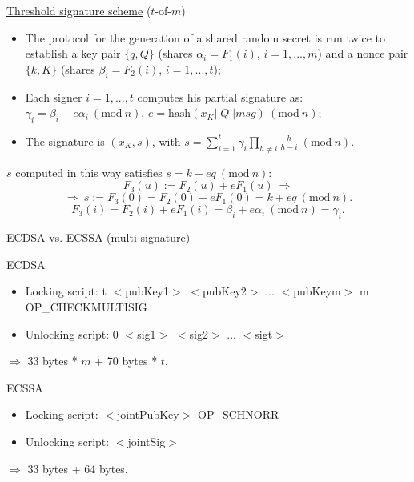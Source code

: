 \documentclass[slidescentered]{beamer}
\begin{document}
	\begin{frame}{\hyperlink{threshold}{Threshold signature scheme} ($t$-of-$m$)}
		\begin{itemize}
			\item The protocol for the generation of a shared random secret is run twice to establish a key pair $\{q, Q\}$ (shares $\alpha_i = F_1(i)$, $i = 1, ..., m$) and a nonce pair $\{k, K\}$ (shares $\beta_i = F_2(i)$, $i = 1, ..., t$);
			\item Each signer $i = 1, ..., t$ computes his partial signature as: $\gamma_i = \beta_i + e\alpha_i \ (\text{mod} \ n)$, $e = \text{hash}(x_K || Q || msg) \ (\text{mod} \ n)$;
			\item The signature is $(x_K, s)$, with $s = \sum_{i = 1}^{t}\gamma_i\prod_{h \neq i}\frac{h}{h - i} \ (\text{mod} \ n)$.
		\end{itemize}
		
		$s$ computed in this way satisfies $s = k + eq \ (\text{mod} \ n)$: 
		$$F_3(u) := F_2(u) + eF_1(u) \ \Longrightarrow$$ 
		$$\Longrightarrow \ s := F_3(0) = F_2(0) + eF_1(0) = k + eq \ (\text{mod} \ n).$$
		$$F_3(i) = F_2(i) + eF_1(i) = \beta_i + e\alpha_i \ (\text{mod} \ n) = \gamma_i.$$
	\end{frame}

	\begin{frame}{ECDSA vs. ECSSA (multi-signature)}
		\begin{block}{ECDSA}
			\begin{itemize}
				\item Locking script: t $<$pubKey1$>$ $<$pubKey2$>$ ... $<$pubKeym$>$ \hphantom{em} \hphantom{em} \hphantom{em} \hphantom{ipsem}m
				OP\_CHECKMULTISIG
				\item Unlocking script: 0 $<$sig1$>$ $<$sig2$>$ ... $<$sigt$>$
			\end{itemize}
		\end{block}
	
		$\Longrightarrow$ 33 bytes * $m$ + 70 bytes * $t$. 
		
		\bigskip
		\noindent
		\begin{block}{ECSSA}
			\begin{itemize}
				\item Locking script: $<$jointPubKey$>$ OP\_SCHNORR
				\item Unlocking script: $<$jointSig$>$
			\end{itemize}
		\end{block}
	
	 $\Longrightarrow$ 33 bytes + 64 bytes.
	\end{frame}
\end{document}
